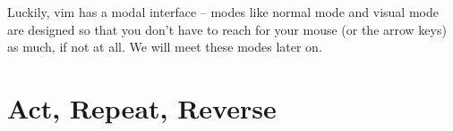 Luckily, vim has a modal interface -- modes like normal mode and visual mode are designed so that you don't have to reach for your mouse (or the arrow keys) as much, if not at all.
We will meet these modes later on.

\section{Act, Repeat, Reverse}













